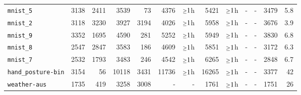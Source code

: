 \begin{tabular}{lrrrrrrrrrrrr}
\texttt{mnist\_5} & 3138 & 2411 & 3539 & 73 & 4376 & $\mathsmaller{\geq}1$h & 5421 & $\mathsmaller{\geq}1$h & - & - & 3479 & 5.8\\
\texttt{mnist\_2} & 3118 & 3230 & 3927 & 3194 & 4026 & $\mathsmaller{\geq}1$h & 5958 & $\mathsmaller{\geq}1$h & - & - & 3676 & 3.9\\
\texttt{mnist\_9} & 3352 & 1695 & 4590 & 281 & 5252 & $\mathsmaller{\geq}1$h & 5949 & $\mathsmaller{\geq}1$h & - & - & 3830 & 6.8\\
\texttt{mnist\_8} & 2547 & 2847 & 3583 & 186 & 4609 & $\mathsmaller{\geq}1$h & 5851 & $\mathsmaller{\geq}1$h & - & - & 3172 & 6.3\\
\texttt{mnist\_7} & 2532 & 1793 & 3483 & 246 & 4542 & $\mathsmaller{\geq}1$h & 6265 & $\mathsmaller{\geq}1$h & - & - & 2848 & 6.7\\
\texttt{hand\_posture-bin} & 3154 & 56 & 10118 & 3431 & 11736 & $\mathsmaller{\geq}1$h & 16265 & $\mathsmaller{\geq}1$h & - & - & 3377 & 42\\
\texttt{weather-aus} & 1735 & 419 & 3258 & 3008 & - & - & 1761 & $\mathsmaller{\geq}1$h & - & - & 1751 & 26\\
\bottomrule
\end{tabular}
